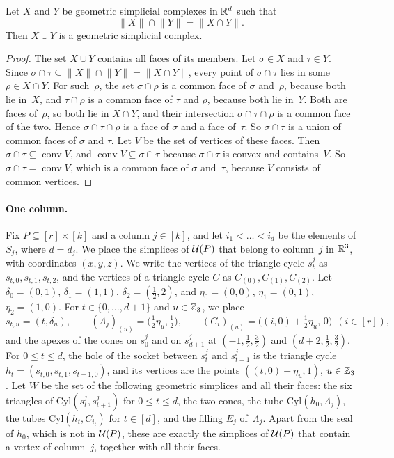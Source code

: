 \begin{lemma}[Gluing]\label{lem:glue}
Let $X$ and $Y$ be geometric simplicial complexes in $\mathbb{R}^d$ such that
\[\lVert X\rVert\cap\lVert Y\rVert=\lVert X\cap Y\rVert.\]
Then $X\cup Y$ is a geometric simplicial complex.
\end{lemma}

\begin{proof}
The set $X\cup Y$ contains all faces of its members.
Let $\sigma\in X$ and $\tau\in Y$.
Since $\sigma\cap\tau\subseteq\lVert X\rVert\cap\lVert Y\rVert=\lVert X\cap Y\rVert$, every point of $\sigma\cap\tau$ lies in some $\rho\in X\cap Y$.
For such~$\rho$, the set $\sigma\cap\rho$ is a common face of $\sigma$ and~$\rho$, because both lie in~$X$, and $\tau\cap\rho$ is a common face of $\tau$ and $\rho$, because both lie in~$Y$.
Both are faces of~$\rho$, so both lie in $X\cap Y$, and their intersection $\sigma\cap\tau\cap\rho$ is a common face of the two.
Hence $\sigma\cap\tau\cap\rho$ is a face of $\sigma$ and a face of~$\tau$.
So $\sigma\cap\tau$ is a union of common faces of $\sigma$ and $\tau$.
Let $V$ be the set of vertices of these faces.
Then $\sigma\cap\tau\subseteq\operatorname{conv}V$, and $\operatorname{conv}V\subseteq\sigma\cap\tau$ because $\sigma\cap\tau$ is convex and contains~$V$.
So $\sigma\cap\tau=\operatorname{conv}V$, which is a common face of $\sigma$ and~$\tau$, because $V$ consists of common vertices.
\end{proof}

\paragraph{One column.}
Fix $P\subseteq[r]\times[k]$ and a column $j\in[k]$, and let $i_1<\dots<i_d$ be the elements of $S_j$, where $d=d_j$.
We place the simplices of $\mathcal{U}(P)$ that belong to column~$j$ in $\mathbb{R}^3$, with coordinates $(x,y,z)$.
We write the vertices of the triangle cycle $s^j_t$ as $s_{t,0},s_{t,1},s_{t,2}$, and the vertices of a triangle cycle $C$ as $C_{(0)},C_{(1)},C_{(2)}$.
Let $\delta_0=(0,1)$, $\delta_1=(1,1)$, $\delta_2=(\frac12,2)$, and $\eta_0=(0,0)$, $\eta_1=(0,1)$, $\eta_2=(1,0)$.
For $t\in\{0,\dots,d+1\}$ and $u\in\mathbb{Z}_3$, we place
\[
  s_{t,u}=(t,\delta_u),\qquad (\Lambda_j)_{(u)}=\bigl(\tfrac12\eta_u,\tfrac12\bigr),\qquad (C_i)_{(u)}=\bigl((i,0)+\tfrac12\eta_u,\,0\bigr)\ \ (i\in[r]),
\]
and the apexes of the cones on $s^j_0$ and on $s^j_{d+1}$ at $(-1,\frac12,\frac32)$ and $(d+2,\frac12,\frac32)$.
For $0\le t\le d$, the hole of the socket between $s^j_t$ and $s^j_{t+1}$ is the triangle cycle $h_t=(s_{t,0},s_{t,1},s_{t+1,0})$, and its vertices are the points $((t,0)+\eta_u,1)$, $u\in\mathbb{Z}_3$.
Let $W$ be the set of the following geometric simplices and all their faces: the six triangles of $\mathrm{Cyl}(s^j_t,s^j_{t+1})$ for $0\le t\le d$, the two cones, the tube $\mathrm{Cyl}(h_0,\Lambda_j)$, the tubes $\mathrm{Cyl}(h_t,C_{i_t})$ for $t\in[d]$, and the filling $E_j$ of~$\Lambda_j$.
Apart from the seal of $h_0$, which is not in $\mathcal{U}(P)$, these are exactly the simplices of $\mathcal{U}(P)$ that contain a vertex of column~$j$, together with all their faces.

